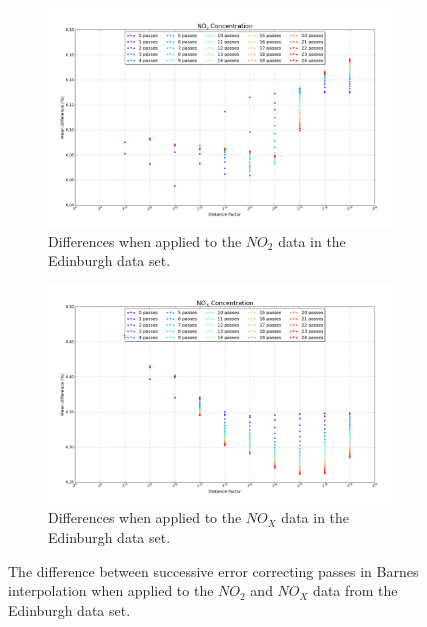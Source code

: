         	\begin{figure}[H]
                \centering
                \begin{subfigure}{\textwidth}
                    \centering
                    \includegraphics[width=\linewidth]{./images/Barnes_Distance_Factor_NO2.png}
                    \caption{Differences when applied to the $NO_{2}$ data in the Edinburgh data set.}
                    \label{fig:barnes_distance_factor_results_NO2}
                \end{subfigure}
                \begin{subfigure}{\textwidth}
                    \includegraphics[width=\linewidth]{./images/Barnes_Distance_Factor_NOx.png}
                    \caption{Differences when applied to the $NO_{X}$ data in the Edinburgh data set.}
                    \label{fig:barnes_distance_factor_results_NOx}
                \end{subfigure}
                \caption{The difference between successive error correcting passes in Barnes interpolation when applied to the $NO_{2}$ and $NO_{X}$ data from the Edinburgh data set.}
                \label{fig:barnes_distance_factor_results_NO2_NOx}
            \end{figure}


